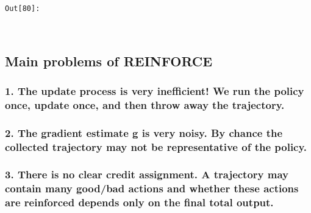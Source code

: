 \documentclass[11pt]{article}
\begin{document}
\texttt{\color{outcolor}Out[{\color{outcolor}80}]:}
    
    \begin{center}
    \end{center}
    { \hspace*{\fill} \\}
    

    \hypertarget{main-problems-of-reinforce}{%
\subsection{Main problems of
REINFORCE}\label{main-problems-of-reinforce}}

\hypertarget{the-update-process-is-very-inefficient-we-run-the-policy-once-update-once-and-then-throw-away-the-trajectory.}{%
\subsubsection{1. The update process is very inefficient! We run the
policy once, update once, and then throw away the
trajectory.}\label{the-update-process-is-very-inefficient-we-run-the-policy-once-update-once-and-then-throw-away-the-trajectory.}}

\hypertarget{the-gradient-estimate-g-is-very-noisy.-by-chance-the-collected-trajectory-may-not-be-representative-of-the-policy.}{%
\subsubsection{2. The gradient estimate g is very noisy. By chance the
collected trajectory may not be representative of the
policy.}\label{the-gradient-estimate-g-is-very-noisy.-by-chance-the-collected-trajectory-may-not-be-representative-of-the-policy.}}

\hypertarget{there-is-no-clear-credit-assignment.-a-trajectory-may-contain-many-goodbad-actions-and-whether-these-actions-are-reinforced-depends-only-on-the-final-total-output.}{%
\subsubsection{3. There is no clear credit assignment. A trajectory may
contain many good/bad actions and whether these actions are reinforced
depends only on the final total
output.}\label{there-is-no-clear-credit-assignment.-a-trajectory-may-contain-many-goodbad-actions-and-whether-these-actions-are-reinforced-depends-only-on-the-final-total-output.}}
\end{document}
